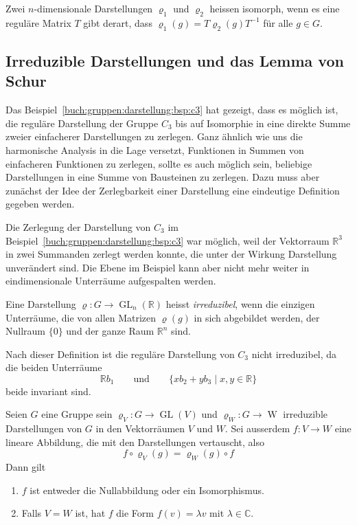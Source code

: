 \begin{definition}
Zwei $n$-dimensionale Darstellungen $\varrho_1$ und $\varrho_2$
heissen isomorph, wenn es eine reguläre Matrix $T$ gibt derart, dass
$\varrho_1(g)=T\varrho_2(g)T^{-1}$ für alle $g\in G$.
\end{definition}

%
%
\subsection{Irreduzible Darstellungen und das Lemma von Schur}
Das Beispiel~\ref{buch:gruppen:darstellung:bsp:c3} hat gezeigt, dass
es möglich ist, die reguläre Darstellung der Gruppe $C_3$ bis auf
Isomorphie in eine direkte Summe zweier einfacherer Darstellungen
zu zerlegen.
Ganz ähnlich wie uns die harmonische Analysis in die Lage versetzt,
Funktionen in Summen von einfacheren Funktionen zu zerlegen, sollte
es auch möglich sein, beliebige Darstellungen in eine Summe von
Bausteinen zu zerlegen.
Dazu muss aber zunächst der Idee der Zerlegbarkeit einer Darstellung
eine eindeutige Definition gegeben werden.

Die Zerlegung der Darstellung von $C_3$ im 
Beispiel~\ref{buch:gruppen:darstellung:bsp:c3} war möglich, weil
der Vektorraum $\mathbb{R}^3$ in zwei Summanden zerlegt werden 
konnte, die unter der Wirkung Darstellung unverändert sind.
Die Ebene im Beispiel kann aber nicht mehr weiter in eindimensionale
Unterräume aufgespalten werden.

\begin{definition}
\label{buch:gruppen:darstellung:def:irreduzibel}
Eine Darstellung $\varrho\colon G\to \operatorname{GL}_n(\mathbb{R})$ 
heisst {\em irreduzibel}, wenn die einzigen Unterräume, die von allen
Matrizen $\varrho(g)$ in sich abgebildet werden, der Nullraum $\{0\}$
und der ganze Raum $\mathbb{R}^n$ sind.
\end{definition}

Nach dieser Definition ist die reguläre Darstellung von $C_3$ nicht
irreduzibel, da die beiden Unterräume
\[
\mathbb{R}b_1%
\qquad\text{und}\qquad
\{
xb_2 + yb_3
\mid
x,y\in\mathbb{R}
\}
\]
beide invariant sind.

\begin{satz}
Seien $G$ eine Gruppe sein $\varrho_V\colon G\to \operatorname{GL}(V)$
und $\varrho_W\colon G\to\operatorname{W}$ irreduzible Darstellungen
von $G$ in den Vektorräumen $V$ und $W$.
Sei ausserdem $f\colon V\to W$ eine lineare Abbildung, die mit den
Darstellungen vertauscht, also
\[
f\circ \varrho_V(g) = \varrho_W(g)\circ f
\]
Dann gilt
\begin{enumerate}
\item $f$ ist entweder die Nullabbildung oder ein Isomorphismus.
\item Falls $V=W$ ist, hat $f$ die Form $f(v)=\lambda v$ mit
$\lambda\in \mathbb{C}$.
\end{enumerate}
\end{satz}

